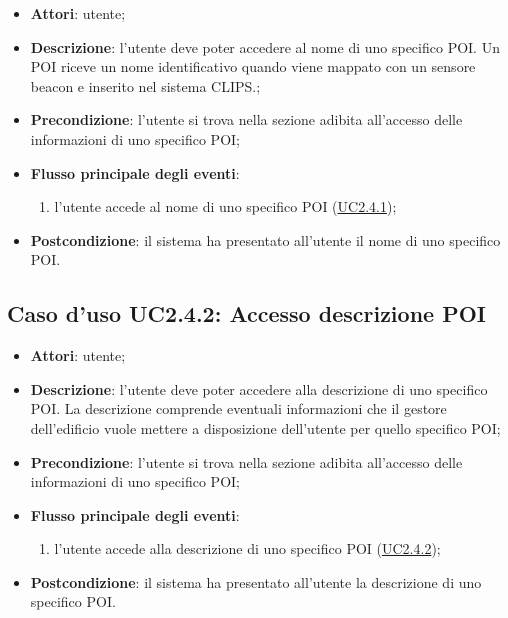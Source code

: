 \documentclass[../AnalisiDeiRequisiti.tex]{subfiles}
\begin{document}
\begin{itemize}
\item \textbf{Attori}: utente;
\item \textbf{Descrizione}: l'utente deve poter accedere al nome di uno specifico POI. Un POI riceve un nome identificativo quando viene mappato con un sensore beacon e inserito nel sistema CLIPS.; 
      \item \textbf{Precondizione}: l'utente si trova nella sezione adibita all'accesso delle informazioni di uno specifico POI;

        \item \textbf{Flusso principale degli eventi}:
          \begin{enumerate}
          \item l'utente accede al nome di uno specifico POI (\hyperlink{UC2.4.1}{UC2.4.1});

      \end{enumerate}
    \item \textbf{Postcondizione}: il sistema ha presentato all'utente il nome di uno specifico POI.
  \end{itemize}
\hypertarget{UC2.4.2}{}
\subsection{Caso d'uso UC2.4.2: Accesso descrizione POI}
\begin{itemize}
\item \textbf{Attori}: utente;
\item \textbf{Descrizione}: l'utente deve poter accedere alla descrizione di uno specifico POI. La descrizione comprende eventuali informazioni che il gestore dell'edificio vuole mettere a disposizione dell'utente per quello specifico POI; 
      \item \textbf{Precondizione}: l'utente si trova nella sezione adibita all'accesso delle informazioni di uno specifico POI;

        \item \textbf{Flusso principale degli eventi}:
          \begin{enumerate}
          \item l'utente accede alla descrizione di uno specifico POI (\hyperlink{UC2.4.2}{UC2.4.2});

      \end{enumerate}
    \item \textbf{Postcondizione}: il sistema ha presentato all'utente la descrizione di uno specifico POI.
  \end{itemize}
\hypertarget{UC3}{}
\end{document}
